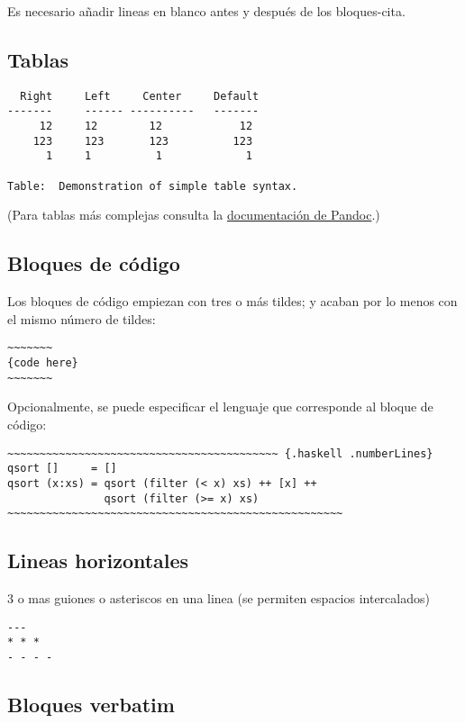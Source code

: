 \documentclass[12pt,spanish,]{article}
\begin{document}
Es necesario añadir lineas en blanco antes y después de los
bloques-cita.

\subsection{Tablas}\label{tablas}

\begin{verbatim}
  Right     Left     Center     Default
-------     ------ ----------   -------
     12     12        12            12
    123     123       123          123
      1     1          1             1

Table:  Demonstration of simple table syntax.
\end{verbatim}

(Para tablas más complejas consulta la
\href{http://pandoc.org/README.html\#tables}{documentación de Pandoc}.)

\subsection{Bloques de código}\label{bloques-de-cuxf3digo}

Los bloques de código empiezan con tres o más tildes; y acaban por lo
menos con el mismo número de tildes:

\begin{verbatim}
~~~~~~~
{code here}
~~~~~~~
\end{verbatim}

Opcionalmente, se puede especificar el lenguaje que corresponde al
bloque de código:

\begin{verbatim}
~~~~~~~~~~~~~~~~~~~~~~~~~~~~~~~~~~~~~~~~~~ {.haskell .numberLines}
qsort []     = []
qsort (x:xs) = qsort (filter (< x) xs) ++ [x] ++
               qsort (filter (>= x) xs)
~~~~~~~~~~~~~~~~~~~~~~~~~~~~~~~~~~~~~~~~~~~~~~~~~~~~
\end{verbatim}

\subsection{Lineas horizontales}\label{lineas-horizontales}

3 o mas guiones o asteriscos en una linea (se permiten espacios
intercalados)

\begin{verbatim}
---
* * *
- - - -
\end{verbatim}

\subsection{Bloques verbatim}\label{bloques-verbatim}
\end{document}
